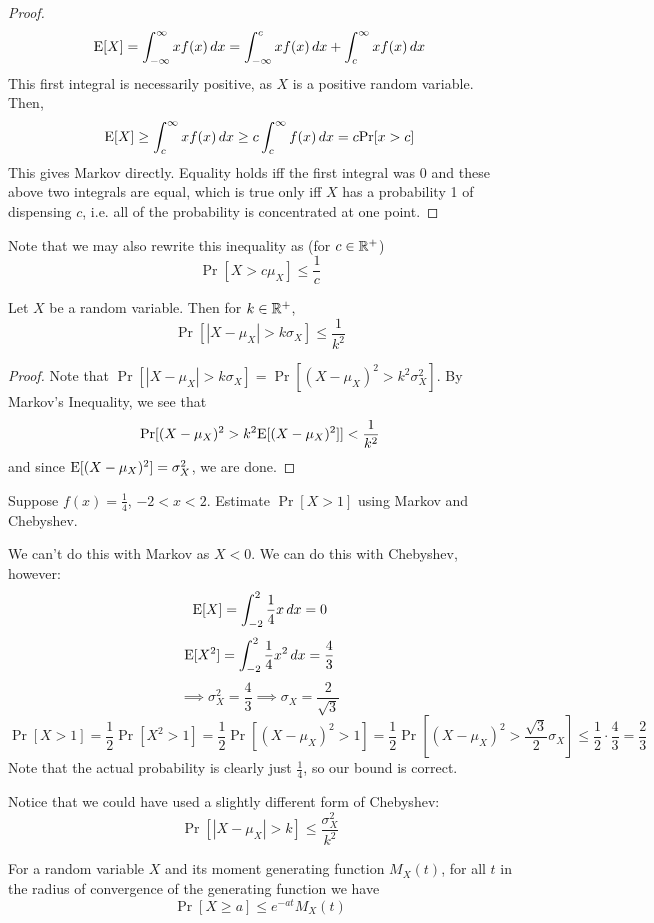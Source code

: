 \documentclass[../main.tex]{subfiles}
\begin{document}
\begin{proof}
\[
    \mathrm E[X] = \int_{-\infty}^\infty x f(x) \,dx = \int_{-\infty}^c x f(x) \,dx + \int_c^\infty x f(x) \,dx 
\]
This first integral is necessarily positive, as $X$ is a positive random variable. Then, 
\[
    \mathrm E[X] \geq \int_c^\infty xf(x) \,dx \geq c \int_c^\infty f(x) \,dx = c \mathrm{Pr}[x > c]
\]
This gives Markov directly. Equality holds iff the first integral was 0 and these above two integrals are equal, which is true only iff $X$ has a probability 1 of dispensing $c$, i.e. all of the probability is concentrated at one point. 
\end{proof}
Note that we may also rewrite this inequality as (for $c \in \mathbb{R}^+$)
\[
    \Pr[X > c \mu_X] \leq \frac{1}{c}
\]
\begin{theorem}
Let $X$ be a random variable. Then for $k \in \mathbb{R}^+$, 
\[
    \Pr[|X-\mu_X| > k \sigma_X] \leq \frac{1}{k^2}
\]
\end{theorem}
\begin{proof}
Note that $\Pr[|X-\mu_X| > k \sigma_X] = \Pr[(X-\mu_X)^2 > k^2\sigma_X^2]$. By Markov's Inequality, we see that 
\[
    \mathrm{Pr}[(X-\mu_X)^2 > k^2\mathrm E[(X-\mu_X)^2]] < \frac{1}{k^2}
\]
and since $\mathrm E[(X-\mu_X)^2] = \sigma_X^2$, we are done. 
\end{proof}
\begin{example}
    Suppose $f(x) = \frac 14$, $-2 < x < 2$. Estimate $\Pr[X > 1]$ using Markov and Chebyshev.
\end{example}
\begin{solution}
We can't do this with Markov as $X < 0$. We can do this with Chebyshev, however: 
\[
    \mathrm E[X] = \int_{-2}^2 \frac 14 x \,dx = 0 
\]
\[
    \mathrm E[X^2] = \int_{-2}^2 \frac 14 x^2 \,dx = \frac 43
\]
\[
    \implies \sigma_X^2 = \frac 43 \implies \sigma_X = \frac{2}{\sqrt 3}
\]
\[
    \Pr[X>1] = \frac 12 \Pr[X^2 > 1] = \frac 12 \Pr[(X-\mu_X)^2>1] = \frac12 \Pr\left[(X-\mu_X)^2 > \frac{\sqrt{3}}{2}\sigma_X\right] \leq \frac 12 \cdot \frac 43 = \frac 23 
\]
Note that the actual probability is clearly just $\frac 14$, so our bound is correct. 
\end{solution}
Notice that we could have used a slightly different form of Chebyshev: 
\[
    \Pr[|X-\mu_X| > k] \leq \frac{\sigma_X^2}{k^2}
\]

\begin{theorem}
For a random variable $X$ and its moment generating function $M_X(t)$, for all $t$ in the radius of convergence of the generating function we have
\[
    \Pr[X \geq a] \leq e^{-at} M_X(t)
\]
\end{theorem}
\end{document}
